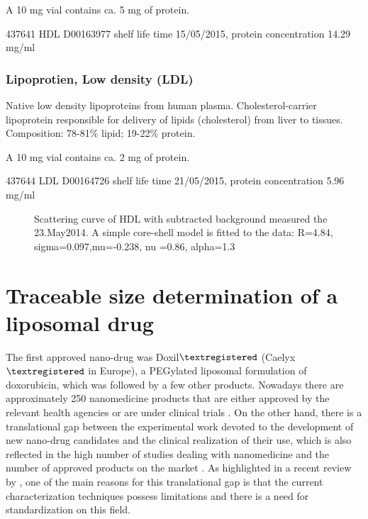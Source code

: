 A 10 mg vial contains ca. 5 mg of protein. 


437641 HDL D00163977 shelf life time 15/05/2015, protein concentration 14.29 mg/ml

\subsubsection{Lipoprotien, Low density (LDL)}

Native low density lipoproteins from human plasma. Cholesterol-carrier lipoprotein responsible for delivery of lipids (cholesterol) from liver to tissues. Composition: 78-81$\%$ lipid; 19-22$\%$ protein.

A 10 mg vial contains ca. 2 mg of protein.

437644 LDL D00164726 shelf life time 21/05/2015,
protein concentration 5.96 mg/ml

\begin{figure}
	\centering
		
		\caption{Scattering curve of HDL with subtracted background measured the 23.May2014. A simple core-shell model is fitted to the data: R=4.84, sigma=0.097,mu=-0.238, nu	=0.86, alpha=1.3}
		\label{fig:HDLCoreShellFit}
\end{figure}

\section{Traceable size determination of a liposomal drug}

The first approved nano-drug was Doxil$\textregistered$ (Caelyx$\textregistered$ in Europe), a PEGylated liposomal formulation of doxorubicin, which was followed by a few other products\cite{yeh_clinical_2011,barenholz_doxil_2012}. Nowadays there are approximately 250 nanomedicine products that are either approved by the relevant health agencies or are under clinical trials \cite{etheridge_big_2013}. On the other hand, there is a translational gap between the experimental work devoted to the development of new nano-drug candidates and the clinical realization of their use, which is also reflected in the high number of studies dealing with nanomedicine and the number of approved products on the market \cite{khorasani_closing_2014, venditto_cancer_2013}. As highlighted in a recent review by \cite{khorasani_closing_2014}, one of the main reasons for this translational gap is that the current characterization techniques possess limitations and there is a need for standardization on this field.

